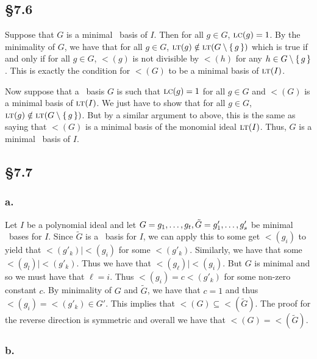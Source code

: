 \documentclass[letterpaper]{article}
\begin{document}
\subsection*{\S 7.6}

Suppose that $G$ is a minimal \Grobner\ basis of $I$.
Then for all $g \in G$, $\operatorname{\textsc{lc}}(g) = 1$.
By the minimality of $G$, we have that for all $g \in G$, $\lt(g) \notin \ideal{\lt(G \setminus \set{g})}$ which is true if and only if for all $g \in G$, $\lt(g)$ is not divisible by $\lt(h)$ for any $h \in G \setminus \set{g}$.
This is exactly the condition for $\lt(G)$ to be a minimal basis of $\ideal{\lt(I)}$.

Now suppose that a \Grobner\ basis $G$ is such that $\operatorname{\textsc{lc}}(g) = 1$ for all $g \in G$ and $\lt(G)$ is a minimal basis of $\ideal{\lt(I)}$.
We just have to show that for all $g \in G$, $\lt(g) \notin \ideal{\lt(G \setminus \set{g})}$.
But by a similar argument to above, this is the same as saying that $\lt(G)$ is a minimal basis of the monomial ideal $\ideal{\lt(I)}$.
Thus, $G$ is a minimal \Grobner\ basis of $I$.

\subsection*{\S 7.7}

\subsubsection*{a.}

Let $I$ be a polynomial ideal and let $G = \gen{g_{1}, \ldots, g_{t}}, \tilde{G} = \gen{g'_{1}, \ldots, g'_{s}}$ be minimal \Grobner\ bases for $I$.
Since $\tilde{G}$ is a \Grobner\ basis for $I$, we can apply this to some get $\lt(g_{i})$ to yield that $\lt(g'_{k}) \mid \lt(g_{i})$ for some $\lt(g'_{k})$.
Similarly, we have that some $\lt(g_{l}) \mid \lt(g'_{k})$.
Thus we have that $\lt(g_{\ell}) \mid \lt(g_{i})$.
But $G$ is minimal and so we must have that $\ell = i$.
Thus $\lt(g_{i}) = c \lt(g'_{k})$ for some non-zero constant $c$.
By minimality of $G$ and $\tilde{G}$, we have that $c = 1$ and thus $\lt(g_{i}) = \lt(g'_{k}) \in G'$.
This implies that $\lt(G) \subseteq \lt(\tilde{G})$.
The proof for the reverse direction is symmetric and overall we have that $\lt(G) = \lt(\tilde{G})$.

\subsubsection*{b.}
\end{document}
